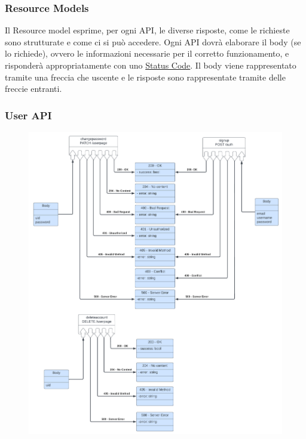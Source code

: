 \documentclass[11pt, a4paper]{article}
\theoremstyle{definition}
\begin{document}
\subsubsection{Resource Models}
Il Resource model esprime, per ogni API, le diverse risposte, come le richieste sono strutturate e come ci si può accedere.
Ogni API dovrà elaborare il body (se lo richiede), ovvero le informazioni necessarie per il corretto funzionamento, e risponderà appropriatamente con uno \href{https://developer.mozilla.org/en-US/docs/Web/HTTP/Status}{Status Code}.
Il body viene rappresentato tramite una freccia che uscente e le risposte sono rappresentate tramite delle freccie entranti.

\subsubsection*{User API}
\begin{figure}[H]
  \hspace*{-2.4cm}
  \centering
  \includegraphics[scale = 0.64]{materiale/Resource Models Users.pdf}
\end{figure}
\end{document}
